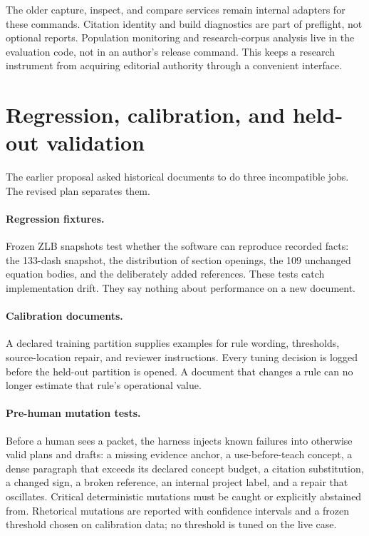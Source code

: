 The older capture, inspect, and compare services remain internal adapters for
these commands. Citation identity and build diagnostics are part of preflight,
not optional reports. Population monitoring and research-corpus analysis live in
the evaluation code, not in an author's release command. This keeps a research
instrument from acquiring editorial authority through a convenient interface.

\section{Regression, calibration, and held-out validation}

The earlier proposal asked historical documents to do three incompatible jobs.
The revised plan separates them.

\paragraph{Regression fixtures.} Frozen ZLB snapshots test whether the software
can reproduce recorded facts: the 133-dash snapshot, the distribution of
section openings, the 109 unchanged equation bodies, and the deliberately added
references. These tests catch implementation drift. They say nothing about
performance on a new document.

\paragraph{Calibration documents.} A declared training partition supplies
examples for rule wording, thresholds, source-location repair, and reviewer
instructions. Every tuning decision is logged before the held-out partition is
opened. A document that changes a rule can no longer estimate that rule's
operational value.

\paragraph{Pre-human mutation tests.} Before a human sees a packet, the harness
injects known failures into otherwise valid plans and drafts: a missing evidence
anchor, a use-before-teach concept, a dense paragraph that exceeds its declared
concept budget, a citation substitution, a changed sign, a broken reference, an
internal project label, and a repair that oscillates. Critical deterministic
mutations must be caught or explicitly abstained from. Rhetorical mutations are
reported with confidence intervals and a frozen threshold chosen on calibration
data; no threshold is tuned on the live case.

